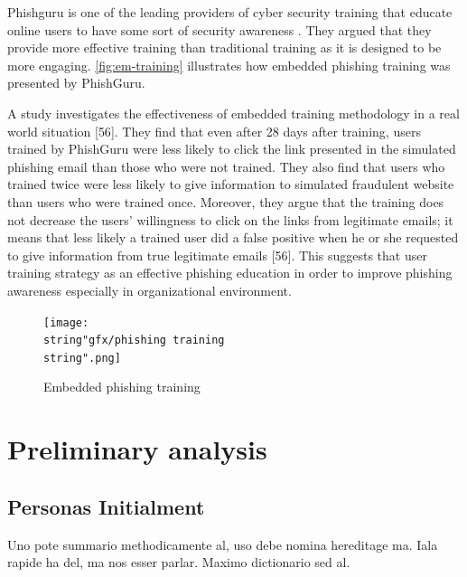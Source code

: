 Phishguru is one of the leading providers of cyber security training
that educate online users to have some sort of security awareness
. They argued that they provide more effective training than traditional
training as it is designed to be more engaging. \autoref{fig:em-training}
illustrates how embedded phishing training was presented by PhishGuru.

A study investigates the effectiveness of embedded training methodology
in a real world situation {[}56{]}. They find that even after 28 days
after training, users trained by PhishGuru were less likely to click
the link presented in the simulated phishing email than those who
were not trained. They also find that users who trained twice were
less likely to give information to simulated fraudulent website than
users who were trained once. Moreover, they argue that the training
does not decrease the users\textquoteright{} willingness to click
on the links from legitimate emails; it means that less likely a trained
user did a false positive when he or she requested to give information
from true legitimate emails {[}56{]}. This suggests that user training
strategy as an effective phishing education in order to improve phishing
awareness especially in organizational environment.

\begin{figure}
\begin{centering}
\texttt{[image: \\string"gfx/phishing training\\string".png]}\protect\caption{\label{fig:em-training}Embedded phishing training}

\par\end{centering}

\end{figure}



\section{Preliminary analysis}


\subsection{Personas Initialment}

Uno pote summario methodicamente al, uso debe nomina hereditage ma.
Iala rapide ha del, ma nos esser parlar. Maximo dictionario sed al.


